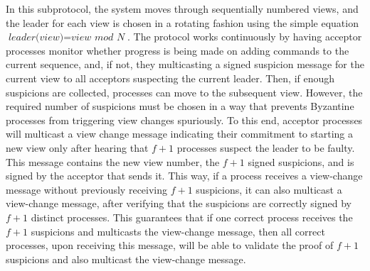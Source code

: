 In this subprotocol, the system moves through sequentially numbered views, and the leader for each view is chosen in a rotating fashion using the simple equation $\textit{leader(view)}=\textit{view mod N}$. The protocol works continuously by having acceptor processes monitor whether progress is being made on adding commands to the current sequence, and, if not, they multicasting a signed {\sc suspicion} message for the current view to all acceptors suspecting the current leader. Then, if enough suspicions are collected, processes can move to the subsequent view. 
However, the required number of suspicions must be chosen in a way that prevents Byzantine processes from triggering view changes spuriously. 
To this end, acceptor processes will multicast a view change message indicating their commitment to starting a new view only after hearing that $f+1$ processes 
suspect the leader to be faulty. This message contains the new view number, the $f+1$ signed suspicions, and is signed by the acceptor that sends it. 
This way, if a process receives a view-change message without previously receiving $f+1$ suspicions, 
it can also multicast a view-change message, after verifying that the suspicions are correctly signed by $f+1$ distinct processes.
This guarantees that if one correct process receives the $f+1$ suspicions and multicasts the view-change message, then all correct processes, upon receiving this message, will be able to validate the proof of $f+1$ suspicions and also multicast the view-change message.\par
